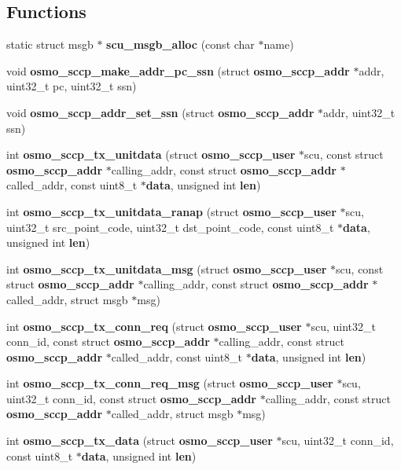 \subsection*{Functions}
\begin{DoxyCompactItemize}
\item 
static struct msgb $\ast$ {\bf scu\+\_\+msgb\+\_\+alloc} (const char $\ast$name)
\item 
void {\bf osmo\+\_\+sccp\+\_\+make\+\_\+addr\+\_\+pc\+\_\+ssn} (struct {\bf osmo\+\_\+sccp\+\_\+addr} $\ast$addr, uint32\+\_\+t pc, uint32\+\_\+t ssn)
\item 
void {\bf osmo\+\_\+sccp\+\_\+addr\+\_\+set\+\_\+ssn} (struct {\bf osmo\+\_\+sccp\+\_\+addr} $\ast$addr, uint32\+\_\+t ssn)
\item 
int {\bf osmo\+\_\+sccp\+\_\+tx\+\_\+unitdata} (struct {\bf osmo\+\_\+sccp\+\_\+user} $\ast$scu, const struct {\bf osmo\+\_\+sccp\+\_\+addr} $\ast$calling\+\_\+addr, const struct {\bf osmo\+\_\+sccp\+\_\+addr} $\ast$called\+\_\+addr, const uint8\+\_\+t $\ast${\bf data}, unsigned int {\bf len})
\item 
int {\bf osmo\+\_\+sccp\+\_\+tx\+\_\+unitdata\+\_\+ranap} (struct {\bf osmo\+\_\+sccp\+\_\+user} $\ast$scu, uint32\+\_\+t src\+\_\+point\+\_\+code, uint32\+\_\+t dst\+\_\+point\+\_\+code, const uint8\+\_\+t $\ast${\bf data}, unsigned int {\bf len})
\item 
int {\bf osmo\+\_\+sccp\+\_\+tx\+\_\+unitdata\+\_\+msg} (struct {\bf osmo\+\_\+sccp\+\_\+user} $\ast$scu, const struct {\bf osmo\+\_\+sccp\+\_\+addr} $\ast$calling\+\_\+addr, const struct {\bf osmo\+\_\+sccp\+\_\+addr} $\ast$called\+\_\+addr, struct msgb $\ast$msg)
\item 
int {\bf osmo\+\_\+sccp\+\_\+tx\+\_\+conn\+\_\+req} (struct {\bf osmo\+\_\+sccp\+\_\+user} $\ast$scu, uint32\+\_\+t conn\+\_\+id, const struct {\bf osmo\+\_\+sccp\+\_\+addr} $\ast$calling\+\_\+addr, const struct {\bf osmo\+\_\+sccp\+\_\+addr} $\ast$called\+\_\+addr, const uint8\+\_\+t $\ast${\bf data}, unsigned int {\bf len})
\item 
int {\bf osmo\+\_\+sccp\+\_\+tx\+\_\+conn\+\_\+req\+\_\+msg} (struct {\bf osmo\+\_\+sccp\+\_\+user} $\ast$scu, uint32\+\_\+t conn\+\_\+id, const struct {\bf osmo\+\_\+sccp\+\_\+addr} $\ast$calling\+\_\+addr, const struct {\bf osmo\+\_\+sccp\+\_\+addr} $\ast$called\+\_\+addr, struct msgb $\ast$msg)
\item 
int {\bf osmo\+\_\+sccp\+\_\+tx\+\_\+data} (struct {\bf osmo\+\_\+sccp\+\_\+user} $\ast$scu, uint32\+\_\+t conn\+\_\+id, const uint8\+\_\+t $\ast${\bf data}, unsigned int {\bf len})

\end{DoxyCompactItemize}
